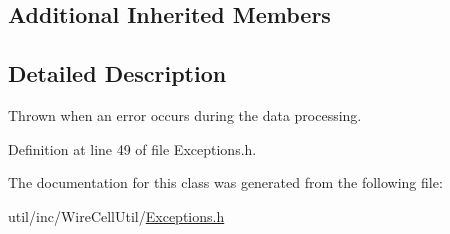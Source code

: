 \subsection*{Additional Inherited Members}


\subsection{Detailed Description}
Thrown when an error occurs during the data processing. 

Definition at line 49 of file Exceptions.\+h.



The documentation for this class was generated from the following file\+:\begin{DoxyCompactItemize}
\item 
util/inc/\+Wire\+Cell\+Util/\hyperlink{_exceptions_8h}{Exceptions.\+h}\end{DoxyCompactItemize}
